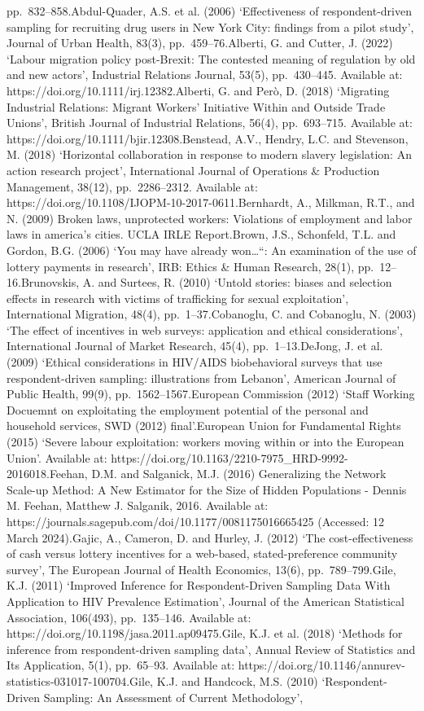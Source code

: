 \documentclass[
  12pt,
  letterpaper,
  DIV=11,
  numbers=noendperiod]{scrartcl}
\begin{document}
{{pp.~832--858.}{Abdul-Quader, A.S. et al. (2006) `Effectiveness of respondent-driven sampling for recruiting drug users in New York City: findings from a pilot study', Journal of Urban Health, 83(3), pp.~459--76.Alberti, G. and Cutter, J. (2022) `Labour migration policy post-Brexit: The contested meaning of regulation by old and new actors', Industrial Relations Journal, 53(5), pp.~430--445. Available at: https://doi.org/10.1111/irj.12382.Alberti, G. and Però, D. (2018) `Migrating Industrial Relations: Migrant Workers' Initiative Within and Outside Trade Unions', British Journal of Industrial Relations, 56(4), pp.~693--715. Available at: https://doi.org/10.1111/bjir.12308.Benstead, A.V., Hendry, L.C. and Stevenson, M. (2018) `Horizontal collaboration in response to modern slavery legislation: An action research project', International Journal of Operations \& Production Management, 38(12), pp.~2286--2312. Available at: https://doi.org/10.1108/IJOPM-10-2017-0611.Bernhardt, A., Milkman, R.T., and N. (2009) Broken laws, unprotected workers: Violations of employment and labor laws in america's cities. UCLA IRLE Report.Brown, J.S., Schonfeld, T.L. and Gordon, B.G. (2006) `You may have already won\ldots``: An examination of the use of lottery payments in research', IRB: Ethics \& Human Research, 28(1), pp.~12--16.Brunovskis, A. and Surtees, R. (2010) `Untold stories: biases and selection effects in research with victims of trafficking for sexual exploitation', International Migration, 48(4), pp.~1--37.Cobanoglu, C. and Cobanoglu, N. (2003) `The effect of incentives in web surveys: application and ethical considerations', International Journal of Market Research, 45(4), pp.~1--13.DeJong, J. et al. (2009) `Ethical considerations in HIV/AIDS biobehavioral surveys that use respondent-driven sampling: illustrations from Lebanon', American Journal of Public Health, 99(9), pp.~1562--1567.European Commission (2012) `Staff Working Docuemnt on exploitating the employment potential of the personal and household services, SWD (2012) final'.European Union for Fundamental Rights (2015) `Severe labour exploitation: workers moving within or into the European Union'. Available at: https://doi.org/10.1163/2210-7975\_HRD-9992-2016018.Feehan, D.M. and Salganick, M.J. (2016) Generalizing the Network Scale-up Method: A New Estimator for the Size of Hidden Populations - Dennis M. Feehan, Matthew J. Salganik, 2016. Available at: https://journals.sagepub.com/doi/10.1177/0081175016665425 (Accessed: 12 March 2024).Gajic, A., Cameron, D. and Hurley, J. (2012) `The cost-effectiveness of cash versus lottery incentives for a web-based, stated-preference community survey', The European Journal of Health Economics, 13(6), pp.~789--799.Gile, K.J. (2011) `Improved Inference for Respondent-Driven Sampling Data With Application to HIV Prevalence Estimation', Journal of the American Statistical Association, 106(493), pp.~135--146. Available at: https://doi.org/10.1198/jasa.2011.ap09475.Gile, K.J. et al. (2018) `Methods for inference from respondent-driven sampling data', Annual Review of Statistics and Its Application, 5(1), pp.~65--93. Available at: https://doi.org/10.1146/annurev-statistics-031017-100704.Gile, K.J. and Handcock, M.S. (2010) `Respondent-Driven Sampling: An Assessment of Current Methodology', }}
\end{document}
